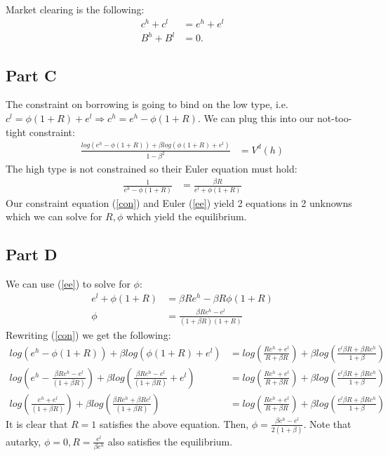 \documentclass[11pt]{article} %
\begin{document}
Market clearing is the following:
\begin{align*}
c^h + c^l &= e^h + e^l\\
B^h + B^l &= 0.
\end{align*}
\subsection{Part C}
The constraint on borrowing is going to bind on the low type, i.e. $c^l= \phi(1+R) + e^l \Rightarrow c^h = e^h - \phi(1+R)$. We can plug this into our not-too-tight constraint:
\begin{align}
\frac{log(e^h - \phi(1+R))+\beta log(\phi(1+R) + e^l)}{1-\beta^2} &= V^d(h) \label{con}
\end{align}
The high type is not constrained so their Euler equation must hold:
\begin{align}
\frac{1}{e^h - \phi(1+R)} &= \frac{\beta R}{e^l + \phi(1+R)} \label{ee}
\end{align}
Our constraint equation (\ref{con}) and Euler (\ref{ee}) yield 2 equations in 2 unknowns which we can solve for $R,\phi$ which yield the equilibrium.
\subsection{Part D}
We can use (\ref{ee}) to solve for $\phi$:
\begin{align*}
e^l + \phi(1+R)&= \beta R e^h - \beta R \phi(1+R)\\
\phi &= \frac{\beta R e^h - e^l}{(1+\beta R)(1+R)}
\end{align*}
Rewriting (\ref{con}) we get the following:
\begin{align*}
log(e^h - \phi(1+R))+\beta log(\phi(1+R) + e^l) &= log\left(\frac{Re^h + e^l}{R+\beta R}\right) + \beta log\left( \frac{e^l \beta R + \beta R e^h }{1+\beta }\right) \\
log\left(e^h - \frac{\beta R e^h - e^l}{(1+\beta R)}\right)+\beta log\left( \frac{\beta R e^h - e^l}{(1+\beta R)} + e^l\right) &= log\left(\frac{Re^h + e^l}{R+\beta R}\right) + \beta log\left( \frac{e^l \beta R + \beta R e^h }{1+\beta }\right) \\
log\left(\frac{e^h + e^l}{(1+\beta R)}\right)+\beta log\left( \frac{\beta R e^h + \beta Re^l}{(1+\beta R)} \right) &= log\left(\frac{Re^h + e^l}{R+\beta R}\right) + \beta log\left( \frac{e^l \beta R + \beta R e^h }{1+\beta }\right) 
\end{align*}
It is clear that $R=1$ satisfies the above equation. Then, $\phi = \frac{\beta e^h - e^l}{2(1+\beta )} $. Note that autarky, $\phi =0,R=\frac{e^l}{\beta e^h}$ also satisfies the equilibrium.
\end{document}
